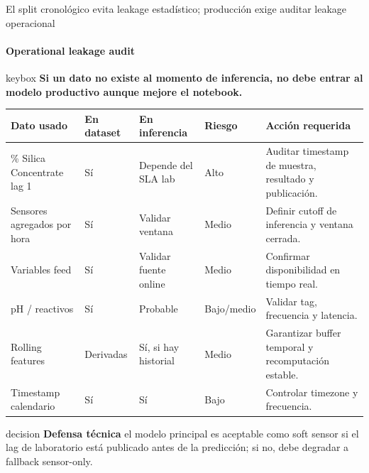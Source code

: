 \documentclass[aspectratio=169,10pt]{beamer}
\newcommand{\keymessage}[1]{%
  \vspace{-0.05cm}
  \begin{beamercolorbox}[wd=\textwidth,sep=0.62em,rounded=true]{keybox}
  \textbf{#1}
  \end{beamercolorbox}\vspace{0.10cm}
}
\newcommand{\decisionbox}[2]{%
  \begin{beamercolorbox}[wd=\textwidth,sep=0.65em,rounded=true]{decision}
  \textbf{\textcolor{MinsurBlue}{#1}}\hspace{0.25em} #2
  \end{beamercolorbox}
}
\begin{document}
\begin{frame}{El split cronológico evita leakage estadístico; producción exige auditar leakage operacional}
\framesubtitle{Operational leakage audit}
\keymessage{Si un dato no existe al momento de inferencia, no debe entrar al modelo productivo aunque mejore el notebook.}
\scriptsize
\begin{tabularx}{\textwidth}{p{}p{}p{}p{}X}
\toprule
\textbf{Dato usado} & \textbf{En dataset} & \textbf{En inferencia} & \textbf{Riesgo} & \textbf{Acción requerida}\\
\midrule
\% Silica Concentrate lag 1 & Sí & Depende del SLA lab & Alto & Auditar timestamp de muestra, resultado y publicación.\\
Sensores agregados por hora & Sí & Validar ventana & Medio & Definir cutoff de inferencia y ventana cerrada.\\
Variables feed & Sí & Validar fuente online & Medio & Confirmar disponibilidad en tiempo real.\\
pH / reactivos & Sí & Probable & Bajo/medio & Validar tag, frecuencia y latencia.\\
Rolling features & Derivadas & Sí, si hay historial & Medio & Garantizar buffer temporal y recomputación estable.\\
Timestamp calendario & Sí & Sí & Bajo & Controlar timezone y frecuencia.\\
\bottomrule
\end{tabularx}
\vspace{0.18cm}
\decisionbox{Defensa técnica}{el modelo principal es aceptable como soft sensor si el lag de laboratorio está publicado antes de la predicción; si no, debe degradar a fallback sensor-only.}
\end{frame}
\end{document}
